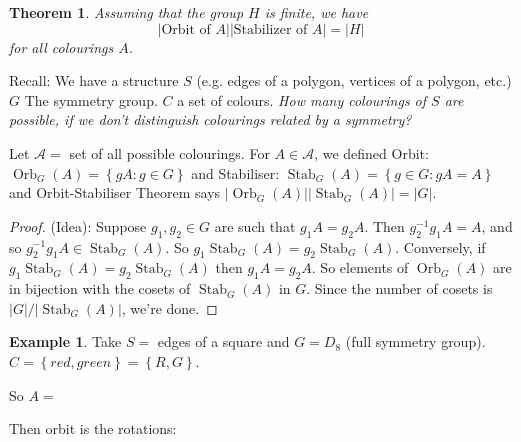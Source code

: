 \documentclass{article}
\newtheorem{theorem}{Theorem}
\theoremstyle{definition} \newtheorem*{definition}{Definition}
\newtheorem*{exmp}{Example} \newtheorem*{exmps}{Examples}
\DeclareMathOperator{\Orb}{Orb} \DeclareMathOperator{\Stab}{Stab}
\begin{document}
 \begin{theorem} Assuming that the group $H$ is finite, we have \[
   \big|\text{Orbit of }A\big| \big|\text{Stabilizer of } A\big|=\big|H\big| \]
   for all colourings $A$.
  
   \label{thm:orbitstabilizer} \end{theorem}

 Recall: We have a structure $S$ (e.g. edges of a polygon, vertices of a
 polygon, etc.) $G$ The symmetry group. $C$ a set of colours. \emph{How many
 colourings of $S$ are possible, if we don't distinguish colourings related by
 a symmetry?}

 Let $\mathcal{A}=$ set of all possible colourings. For $A \in \mathcal{A}$, we
 defined Orbit: $\Orb_G(A)=\left\{ gA : g \in G \right\}$ and Stabiliser:
 $\Stab_G(A) = \left\{ g \in G : gA = A \right\}$ and Orbit-Stabiliser Theorem
 says $|\Orb_G(A)||\Stab_G(A)|=|G|$.

 \begin{proof} (Idea): Suppose $g_1,g_2\in G$ are such that $g_1A=g_2A$. Then
   $g_2^{-1}g_1A=A$, and so $g_2^{-1}g_1A \in \Stab_G(A)$. So
   $g_1\Stab_G(A)=g_2\Stab_G(A)$. Conversely, if $g_1\Stab_G(A)=g_2\Stab_G(A)$
   then $g_1A=g_2A$. So elements of $\Orb_G(A)$ are in bijection with the
   cosets of $\Stab_G(A)$ in $G$. Since the number of cosets is
   $|G|/|\Stab_G(A)|$, we're done.  \end{proof} 

 \begin{exmp} Take $S=$ edges of a square and $G=D_8$ (full symmetry group). $C
   = \left\{ red, green \right\}=\left\{ R,G \right\}$. 
   
   So $A=$ \begin{figure}[h] \centering {}
     \label{fig:coloursquare} \end{figure}
 
 \end{exmp}

  Then orbit is the rotations:
\end{document}
